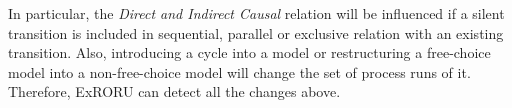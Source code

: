 \documentclass{llncs}
\begin{document}
In particular, the \textit{Direct and Indirect Causal} relation will be influenced if a silent transition is included in sequential, parallel or exclusive relation with an existing transition. Also, introducing a cycle into a model or restructuring a free-choice model into a non-free-choice model will change the set of process runs of it. Therefore, ExRORU can detect all the changes above.


\end{document}

